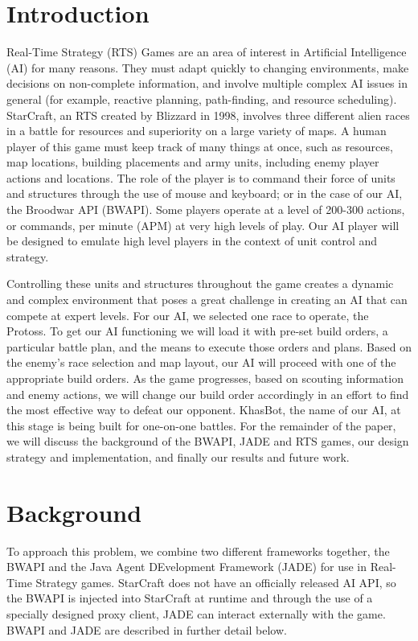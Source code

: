 \documentclass[letterpaper]{article}
\begin{document}
\section{Introduction}
Real-Time Strategy (RTS) Games are an area of interest in Artificial Intelligence (AI) for many reasons.  They must adapt quickly to changing environments, make decisions on non-complete information, and involve multiple complex AI issues in general (for example, reactive planning, path-finding, and resource scheduling).  StarCraft, an RTS created by Blizzard in 1998, involves three different alien races in a battle for resources and superiority on a large variety of maps.  A human player of this game must keep track of many things at once, such as resources, map locations, building placements and army units, including enemy player actions and locations.  The role of the player is to command their force of units and structures through the use of mouse and keyboard; or in the case of our AI, the Broodwar API (BWAPI). Some players operate at a level of 200-300 actions, or commands, per minute (APM) at very high levels of play. Our AI player will be designed to emulate high level players in the context of unit control and strategy.

Controlling these units and structures throughout the game creates a dynamic and complex environment that poses a great challenge in creating an AI that can compete at expert levels.  For our AI, we selected one race to operate, the Protoss.  To get our AI functioning we will load it with pre-set build orders, a particular battle plan, and the means to execute those orders and plans.  Based on the enemy's race selection and map layout, our AI will proceed with one of the appropriate build orders.  As the game progresses, based on scouting information and enemy actions, we will change our build order accordingly in an effort to find the most effective way to defeat our opponent.  KhasBot, the name of our AI, at this stage is being built for one-on-one battles.
For the remainder of the paper, we will discuss the background of the BWAPI, JADE and RTS games, our design strategy and implementation, and finally our results and future work.

\section{Background}
To approach this problem, we combine two different frameworks together, the BWAPI and the Java Agent DEvelopment Framework (JADE) for use in Real-Time Strategy games.  StarCraft does not have an officially released AI API, so the BWAPI is injected into StarCraft at runtime and through the use of a specially designed proxy client, JADE can interact externally with the game.  BWAPI and JADE are described in further detail below.
\end{document}
